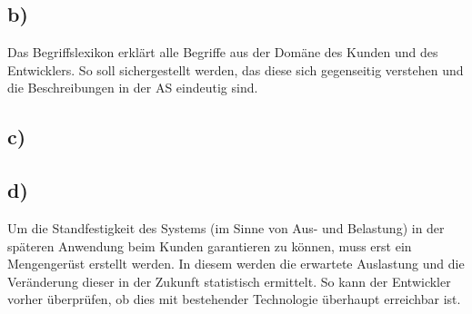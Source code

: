 \documentclass{swp1}
\begin{document}
\subsection*{b)}
Das Begriffslexikon erklärt alle Begriffe aus der Domäne des Kunden und des Entwicklers. So soll
sichergestellt werden, das diese sich gegenseitig verstehen und die Beschreibungen in der AS
eindeutig sind.\\
\subsection*{c)}
\subsection*{d)}
Um die Standfestigkeit des Systems (im Sinne von Aus- und Belastung) in der späteren
Anwendung beim Kunden garantieren zu können, muss erst ein Mengengerüst erstellt werden. In diesem werden die erwartete Auslastung und die Veränderung dieser in der Zukunft statistisch
ermittelt. So kann der Entwickler vorher überprüfen, ob dies mit bestehender Technologie
überhaupt erreichbar ist.
















\begin{figure}
\label{Bild:image}
\end{figure}
\end{document}

